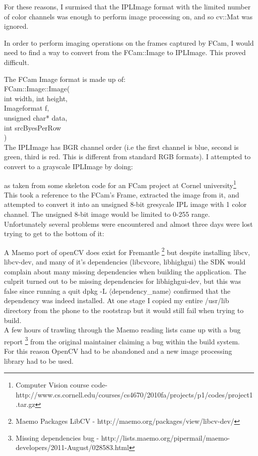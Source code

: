 For these reasons, I surmised that the IPLImage format with the limited number of color channels was enough to perform image processing on, and so cv::Mat was ignored.

In order to perform imaging operations on the frames captured by FCam, I would need to find a way to convert from the FCam::Image to IPLImage. This proved difficult.

The FCam Image format is made up of:\\
\tab FCam::Image::Image(\\
\tab\tab int width,  int height,\\
\tab\tab Imageformat f,\\
\tab\tab unsigned char* data,\\
\tab\tab int srcByesPerRow\\
)\\
The IPLImage has BGR channel order (i.e the first channel is blue, second is green, third is red. This is different from standard RGB formats). I attempted to convert to a grayscale IPLImage by doing:
\begin{frame}{}

\end{frame}
as taken from some skeleton code for an FCam project at Cornel university\footnote{Computer Vision course code- http://www.cs.cornell.edu/courses/cs4670/2010fa/projects/p1/codes/project1.tar.gz}\label{ref:snavelly}\\
This took a reference to the FCam's Frame, extracted the image from it, and attempted to convert it into an unsigned 8-bit gresycale IPL image with 1 color channel. The unsigned 8-bit image would be limited to 0-255 range.\\
Unfortunately several problems were encountered and almost three days were lost trying to get to the bottom of it:

A Maemo port of openCV does exist for Fremantle \footnote{Maemo Packages LibCV - http://maemo.org/packages/view/libcv-dev/}\label{ref:libcv} but despite installing libcv, libcv-dev, and many of it's dependencies (libcvcore, libhighgui) the SDK would complain about many missing dependencies when building the application. The culprit turned out to be missing dependencies for libhighgui-dev, but this was false since running a quit dpkg -L \(\langle\)dependency\_name\(\rangle\) confirmed that the dependency was indeed installed. At one stage I copied my entire /usr/lib directory from the phone to the rootstrap but it would still fail when trying to build.\\
A few hours of trawling through the Maemo reading lists came up with a bug report \footnote{Missing dependencies bug - http://lists.maemo.org/pipermail/maemo-developers/2011-August/028583.html}\label{ref:depbug} from the original maintainer claiming a bug within the build system.\\
For this reason OpenCV had to be abandoned and a new image processing library had to be used.


